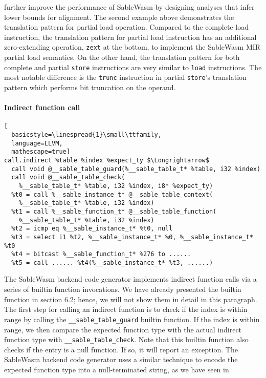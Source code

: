 further improve the performance of SableWasm by designing analyses that infer
lower bounds for alignment. The second example above demonstrates the
translation pattern for partial load operation. Compared to the complete load
instruction, the translation pattern for partial load instruction has an
additional zero-extending operation, \texttt{zext} at the bottom, to implement
the SableWasm MIR partial load semantics. On the other hand, the translation
pattern for both complete and partial \texttt{store} instructions are very
similar to \texttt{load} instructions. The most notable difference is the
\texttt{trunc} instruction in partial \texttt{store}'s translation pattern
which performs bit truncation on the operand.

\paragraph{Indirect function call} \quad
\begin{lstlisting}[
  basicstyle=\linespread{1}\small\ttfamily, 
  language=LLVM, 
  mathescape=true]
call.indirect %table %index %expect_ty $\Longrightarrow$ 
  call void @__sable_table_guard(%__sable_table_t* %table, i32 %index)
  call void @__sable_table_check(
    %__sable_table_t* %table, i32 %index, i8* %expect_ty)
  %t0 = call %__sable_instance_t* @__sable_table_context(
    %__sable_table_t* %table, i32 %index)
  %t1 = call %__sable_function_t* @__sable_table_function(
    %__sable_table_t* %table, i32 %index)
  %t2 = icmp eq %__sable_instance_t* %t0, null
  %t3 = select i1 %t2, %__sable_instance_t* %0, %__sable_instance_t* %t0
  %t4 = bitcast %__sable_function_t* %276 to ......
  %t5 = call ...... %t4(%__sable_instance_t* %t3, ......)
\end{lstlisting}
The SableWasm backend code generator implements indirect function calls via a
series of builtin function invocations. We have already presented the builtin
function in section 6.2; hence, we will not show them in detail in this
paragraph. The first step for calling an indirect function is to check if the
index is within range by calling the \texttt{\_\_sable\_table\_guard} builtin
function. If the index is within range, we then compare the expected function
type with the actual indirect function type with
\texttt{\_\_sable\_table\_check}. Note that this builtin function also checks
if the entry is a null function. If so, it will report an exception. The
SableWasm backend code generator uses a similar technique to encode the
expected function type into a null-terminated string, as we have seen in
